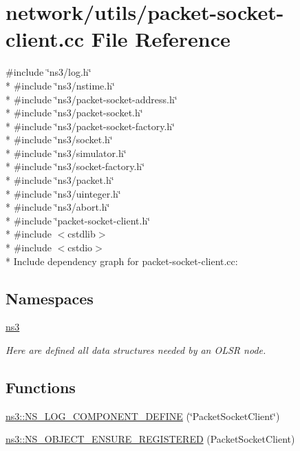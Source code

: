 \hypertarget{packet-socket-client_8cc}{}\section{network/utils/packet-\/socket-\/client.cc File Reference}
\label{packet-socket-client_8cc}
{\ttfamily \#include \char`\"{}ns3/log.\+h\char`\"{}}\\*
{\ttfamily \#include \char`\"{}ns3/nstime.\+h\char`\"{}}\\*
{\ttfamily \#include \char`\"{}ns3/packet-\/socket-\/address.\+h\char`\"{}}\\*
{\ttfamily \#include \char`\"{}ns3/packet-\/socket.\+h\char`\"{}}\\*
{\ttfamily \#include \char`\"{}ns3/packet-\/socket-\/factory.\+h\char`\"{}}\\*
{\ttfamily \#include \char`\"{}ns3/socket.\+h\char`\"{}}\\*
{\ttfamily \#include \char`\"{}ns3/simulator.\+h\char`\"{}}\\*
{\ttfamily \#include \char`\"{}ns3/socket-\/factory.\+h\char`\"{}}\\*
{\ttfamily \#include \char`\"{}ns3/packet.\+h\char`\"{}}\\*
{\ttfamily \#include \char`\"{}ns3/uinteger.\+h\char`\"{}}\\*
{\ttfamily \#include \char`\"{}ns3/abort.\+h\char`\"{}}\\*
{\ttfamily \#include \char`\"{}packet-\/socket-\/client.\+h\char`\"{}}\\*
{\ttfamily \#include $<$cstdlib$>$}\\*
{\ttfamily \#include $<$cstdio$>$}\\*
Include dependency graph for packet-\/socket-\/client.cc\+:
\subsection*{Namespaces}
\begin{DoxyCompactItemize}
\item 
 \hyperlink{namespacens3}{ns3}
\begin{DoxyCompactList}\small\item\em Here are defined all data structures needed by an O\+L\+SR node. \end{DoxyCompactList}\end{DoxyCompactItemize}
\subsection*{Functions}
\begin{DoxyCompactItemize}
\item 
\hyperlink{namespacens3_a29c1114490085dd4de954cadd81bea98}{ns3\+::\+N\+S\+\_\+\+L\+O\+G\+\_\+\+C\+O\+M\+P\+O\+N\+E\+N\+T\+\_\+\+D\+E\+F\+I\+NE} (\char`\"{}Packet\+Socket\+Client\char`\"{})
\item 
\hyperlink{namespacens3_aef20a9cfb120a20c08f035728b3b072f}{ns3\+::\+N\+S\+\_\+\+O\+B\+J\+E\+C\+T\+\_\+\+E\+N\+S\+U\+R\+E\+\_\+\+R\+E\+G\+I\+S\+T\+E\+R\+ED} (Packet\+Socket\+Client)
\end{DoxyCompactItemize}
